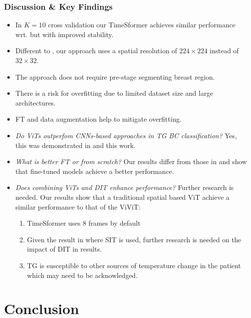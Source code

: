 \documentclass{beamer}
\begin{document}
\begin{frame}[allowframebreaks]
  \frametitle{Discussion \& Key Findings}
\begin{itemize}
\item In $K=10$ cross validation our TimeSformer achieves similar
  performance wrt. \cite{DeMatheus2023} but with improved stability.
\item Different to \cite{DeMatheus2023}, our approach uses a spatial
  resolution of $224 \times 224$ instead of $32 \times 32$.
\item The approach does not require pre-stage segmenting breast
  region.
\item There is a risk for overfitting due to limited dataset size and
  large architectures.
\item \ac{FT} and data augmentation help to mitigate overfitting.

\end{itemize}
\newpage
\begin{itemize}
\item \textit{Do \ac{ViTs} outperfom \ac{CNNs}-based approaches in
  \ac{TG} \ac{BC} classification?} Yes, this was demonstrated in
\cite{Garia2023} and this work.
\item \textit{What is better \ac{FT} or from scratch?} Our results
  differ from those in \cite{Garia2023} and show that fine-tuned
  models achieve a better performance.
\item \textit{Does combining \ac{ViTs} and \ac{DIT} enhance
    performance?} Further research is needed. Our results show that a
  traditional spatial based \ac{ViT} achieve a similar performance to
  that of the \ac{ViViT}:
  \begin{enumerate}
  \item TimeSformer uses 8 frames by default
  \item Given the result in \cite{Garia2023} where \ac{SIT} is used,
    further research is needed on the impact of \ac{DIT} in results.
  \item \ac{TG} is susceptible to other sources of temperature change
    in the patient which may need to be acknowledged.
  \end{enumerate}

\end{itemize}
\end{frame}
\section{Conclusion}
\end{document}
